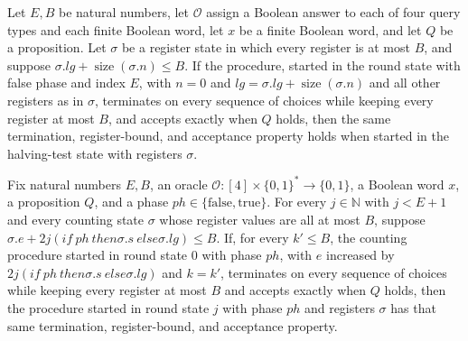 \begin{theorem}
\label{Complexity.LogProg.ISGen.ghalf_run}
\leanok
{}
Let $E,B$ be natural numbers, let $\mathcal O$ assign a Boolean answer to each of four
query types and each finite Boolean word, let $x$ be a finite Boolean word, and let $Q$
be a proposition. Let $\sigma$ be a register state in which every register is at most
$B$, and suppose $\sigma.lg+\operatorname{size}(\sigma.n)\le B$. If the procedure,
started in the round state with false phase and index $E$, with $n=0$ and
$lg=\sigma.lg+\operatorname{size}(\sigma.n)$ and all other registers as in $\sigma$,
terminates on every sequence of choices while keeping every register at most $B$, and
accepts exactly when $Q$ holds, then the same termination, register-bound, and
acceptance property holds when started in the halving-test state with registers
$\sigma$.
\end{theorem}

\begin{theorem}
\label{Complexity.LogProg.ISGen.grounds_run}
\leanok
{}
Fix natural numbers $E,B$, an oracle $\mathcal O:[4]\times\{0,1\}^*\to\{0,1\}$, a
Boolean word $x$, a proposition $Q$, and a phase
$ph\in\{\mathrm{false},\mathrm{true}\}$. For every $j\in\mathbb N$ with $j<E+1$ and
every counting state $\sigma$ whose register values are all at most $B$, suppose
$\sigma.e+2j(if\ ph\ then\sigma.s\ else\sigma.lg)\le B$. If, for every $k'\le B$, the
counting procedure started in round state $0$ with phase $ph$, with $e$ increased by
$2j(if\ ph\ then\sigma.s\ else\sigma.lg)$ and $k=k'$, terminates on every sequence of
choices while keeping every register at most $B$ and accepts exactly when $Q$ holds,
then the procedure started in round state $j$ with phase $ph$ and registers $\sigma$ has
that same termination, register-bound, and acceptance property.
\end{theorem}

